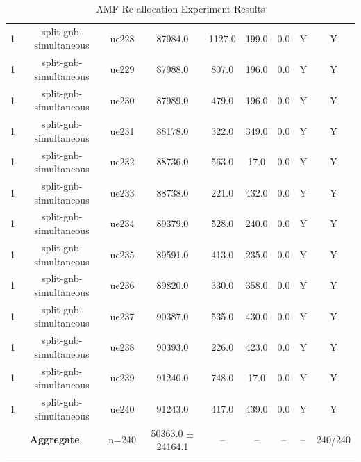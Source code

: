 \begin{table}[ht]
\begin{tabular}{|c|c|c|c|c|c|c|c|c|}
1 & split-gnb-simultaneous & ue228 & 87984.0 & 1127.0 & 199.0 & 0.0 & Y & Y \\
1 & split-gnb-simultaneous & ue229 & 87988.0 & 807.0 & 196.0 & 0.0 & Y & Y \\
1 & split-gnb-simultaneous & ue230 & 87989.0 & 479.0 & 196.0 & 0.0 & Y & Y \\
1 & split-gnb-simultaneous & ue231 & 88178.0 & 322.0 & 349.0 & 0.0 & Y & Y \\
1 & split-gnb-simultaneous & ue232 & 88736.0 & 563.0 & 17.0 & 0.0 & Y & Y \\
1 & split-gnb-simultaneous & ue233 & 88738.0 & 221.0 & 432.0 & 0.0 & Y & Y \\
1 & split-gnb-simultaneous & ue234 & 89379.0 & 528.0 & 240.0 & 0.0 & Y & Y \\
1 & split-gnb-simultaneous & ue235 & 89591.0 & 413.0 & 235.0 & 0.0 & Y & Y \\
1 & split-gnb-simultaneous & ue236 & 89820.0 & 330.0 & 358.0 & 0.0 & Y & Y \\
1 & split-gnb-simultaneous & ue237 & 90387.0 & 535.0 & 430.0 & 0.0 & Y & Y \\
1 & split-gnb-simultaneous & ue238 & 90393.0 & 226.0 & 423.0 & 0.0 & Y & Y \\
1 & split-gnb-simultaneous & ue239 & 91240.0 & 748.0 & 17.0 & 0.0 & Y & Y \\
1 & split-gnb-simultaneous & ue240 & 91243.0 & 417.0 & 439.0 & 0.0 & Y & Y \\
\multicolumn{2}{|c|}{\textbf{Aggregate}} & n=240 & 50363.0 $\pm$ 24164.1 & -- & -- & -- & -- & 240/240 \\
\hline
\end{tabular}
\caption{AMF Re-allocation Experiment Results}
\label{tab:amf_realloc}
\end{table}
